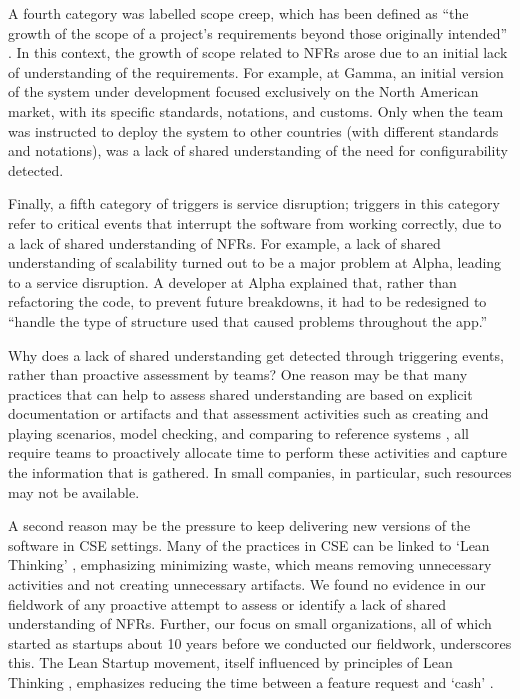 \documentclass[smallextended]{svjour3}       %
\begin{document}
A fourth category was labelled scope creep, which has been defined as ``the growth of the scope of a project's requirements beyond those originally intended'' \citep{williams2009exploring}. In this context, the growth of scope related to NFRs arose due to an initial lack of understanding of the requirements. For example, at Gamma, an initial version of the system under development focused exclusively on the North American market, with its specific standards, notations, and customs. Only when the team was instructed to deploy the system to other countries (with different standards and notations), was a lack of shared understanding of the need for configurability detected. 

Finally, a fifth category of triggers is service disruption; triggers in this category refer to critical events that interrupt the software from working correctly, due to a lack of shared understanding of NFRs. For example, a lack of shared understanding of scalability turned out to be a major problem at Alpha, leading to a service disruption. A developer at Alpha explained that, rather than refactoring the code, to prevent future breakdowns, it had to be redesigned to \textmd{``handle the type of structure used that caused problems throughout the app.''}


Why does a lack of shared understanding get detected through triggering events, rather than proactive assessment by teams?
One reason may be that many practices that can help to assess shared understanding are based on explicit documentation or artifacts \citep{glinz_shared_2015} and that assessment activities such as 
creating and playing scenarios, model checking, and comparing to reference systems \citep{glinz_shared_2015}, 
all require teams to proactively allocate time to perform these activities and capture the information that is gathered. In small companies, in particular, such resources may not be available.

A second reason may be the pressure to keep delivering new versions of the software in CSE settings. Many of the practices in CSE can be linked to `Lean Thinking' \citep{fitzgerald2017continuous}, emphasizing minimizing waste, which means removing unnecessary activities and not creating unnecessary artifacts. We found no evidence in our fieldwork of any proactive attempt to assess or identify a lack of shared understanding of NFRs. 
Further, our focus on small organizations, all of which started as startups about 10 years before we conducted our fieldwork, underscores this. The Lean Startup movement, itself influenced by principles of Lean Thinking \citep{ries_lean_2011}, emphasizes reducing the time between a feature request and `cash' \citep{fitzgerald2017continuous}. 
\end{document}
